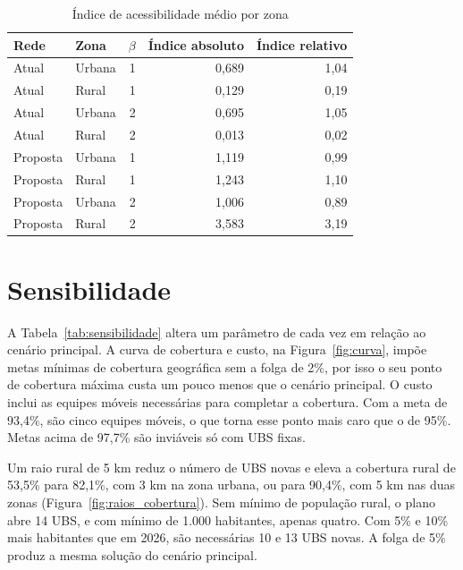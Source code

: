 \begin{table}[htbp]\centering
\caption{Índice de acessibilidade médio por zona}\label{tab:acessibilidade}
\begin{tabular}{llrrr}\toprule Rede & Zona & $\beta$ & Índice absoluto & Índice relativo\\\midrule
Atual & Urbana & 1 & 0,689 & 1,04\\
Atual & Rural & 1 & 0,129 & 0,19\\
Atual & Urbana & 2 & 0,695 & 1,05\\
Atual & Rural & 2 & 0,013 & 0,02\\
Proposta & Urbana & 1 & 1,119 & 0,99\\
Proposta & Rural & 1 & 1,243 & 1,10\\
Proposta & Urbana & 2 & 1,006 & 0,89\\
Proposta & Rural & 2 & 3,583 & 3,19\\
\bottomrule\end{tabular}
\end{table}

\section{Sensibilidade}

A Tabela~\ref{tab:sensibilidade} altera um parâmetro de cada vez em relação ao cenário principal. A
curva de cobertura e custo, na Figura~\ref{fig:curva}, impõe metas mínimas de cobertura geográfica sem a
folga de 2\%, por isso o seu ponto de cobertura máxima custa um pouco menos que o cenário principal. O
custo inclui as equipes móveis necessárias para completar a cobertura. Com a meta de 93,4\%, são cinco
equipes móveis, o que torna esse ponto mais caro que o de 95\%. Metas acima de 97,7\% são inviáveis só
com UBS fixas.

Um raio rural de 5 km reduz o número de UBS novas e eleva a cobertura rural de 53,5\% para 82,1\%, com
3 km na zona urbana, ou para 90,4\%, com 5 km nas duas zonas (Figura~\ref{fig:raios_cobertura}). Sem
mínimo de população rural, o plano abre 14 UBS, e com mínimo de 1.000 habitantes, apenas quatro. Com 5\%
e 10\% mais habitantes que em 2026, são necessárias 10 e 13 UBS novas. A folga de 5\% produz a mesma
solução do cenário principal.

